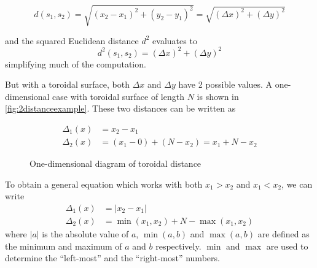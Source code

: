 \begin{equation}
    \label{eq:euclid}
    d(s_1,s_2)=\sqrt{(x_2-x_1)^2+(y_2-y_1)^2}=\sqrt{(\Delta x)^2+(\Delta y)^2}
\end{equation}

and the squared Euclidean distance $d^2$ evaluates to
\begin{equation}
    d^2(s_1,s_2)=(\Delta x)^2+(\Delta y)^2
    \label{eq:squaredEuclid}
\end{equation}
simplifying much of the computation.

But with a toroidal surface, both $\Delta x$ and $\Delta y$ have 2 possible values. A one-dimensional case with toroidal surface of length $N$ is shown in \autoref{fig:2distanceexample}. These two distances can be written as

\begin{align*}
    \Delta_1(x)&=x_2-x_1 \\
    \Delta_2(x)&=(x_1-0)+(N-x_2)=x_1+N-x_2
\end{align*}

\begin{figure}[htpb]
    \centering
    \caption{One-dimensional diagram of toroidal distance}%
    \label{fig:2distanceexample}
\end{figure}


To obtain a general equation which works with both $x_1>x_2$ and $x_1<x_2$, we can write
\begin{align*}
    \Delta_1(x)&=\lvert x_2-x_1 \rvert \\
    \Delta_2(x)&=\min{(x_1,x_2)}+N-\max{(x_1,x_2)}
\end{align*}
where $ \lvert a\rvert$ is the absolute value of $a$, $\min{(a,b)}$ and $\max{(a,b)}$ are defined as the minimum and maximum of $a$ and $b$ respectively. $\min$ and $\max$ are used to determine the  ``left-most'' and the ``right-most'' numbers.

